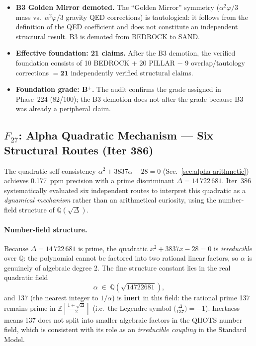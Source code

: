 \documentclass[aps,prd,twocolumn,superscriptaddress,floatfix,nofootinbib]{revtex4-2}
\theoremstyle{definition}
\theoremstyle{remark}
\newcommand{\vp}{\varphi}
\begin{document}
\begin{itemize}
  \item \textbf{B3 Golden Mirror demoted.}  The ``Golden Mirror'' symmetry
        ($\alpha^2\vp/3$ mass vs.\ $\alpha^2\vp/3$ gravity QED corrections) is
        tautological: it follows from the definition of the QED coefficient and does
        not constitute an independent structural result.  B3 is demoted from
        BEDROCK to SAND.
  \item \textbf{Effective foundation: 21 claims.}  After the B3 demotion, the
        verified foundation consists of 10 BEDROCK $+$ 20 PILLAR $-$ 9 overlap/tautology
        corrections $= \mathbf{21}$ independently verified structural claims.
  \item \textbf{Foundation grade: B$^+$.}  The audit confirms the grade assigned in
        Phase~224 (82/100); the B3 demotion does not alter the grade because B3 was
        already a peripheral claim.
\end{itemize}

\subsection{$F_{27}$: Alpha Quadratic Mechanism --- Six Structural Routes (Iter 386)}
\label{sec:f27-alpha-mechanism}

The quadratic self-consistency $\alpha^2 + 3837\alpha - 28 = 0$ (Sec.~\ref{sec:alpha-arithmetic})
achieves 0.177~ppm precision with a prime discriminant
$\Delta = 14\,722\,681$.  Iter~386 systematically evaluated six independent routes to
interpret this quadratic as a \textit{dynamical mechanism} rather than an arithmetical
curiosity, using the number-field structure of $\mathbb{Q}(\sqrt{\Delta})$.

\paragraph{Number-field structure.}
Because $\Delta = 14\,722\,681$ is prime, the quadratic $x^2 + 3837x - 28 = 0$ is
\textit{irreducible} over $\mathbb{Q}$: the polynomial cannot be factored into two
rational linear factors, so $\alpha$ is genuinely of algebraic degree 2.  The fine
structure constant lies in the real quadratic field
\begin{equation}
  \alpha \;\in\; \mathbb{Q}\!\left(\sqrt{14722681}\right),
\end{equation}
and 137 (the nearest integer to $1/\alpha$) is \textbf{inert} in this field: the rational
prime 137 remains prime in $\mathbb{Z}[\tfrac{1+\sqrt{\Delta}}{2}]$ (i.e.\ the Legendre
symbol $\bigl(\tfrac{\Delta}{137}\bigr) = -1$).  Inertness means 137 does not split into
smaller algebraic factors in the QHOTS number field, which is consistent with its role as
an \textit{irreducible coupling} in the Standard Model.
\end{document}
